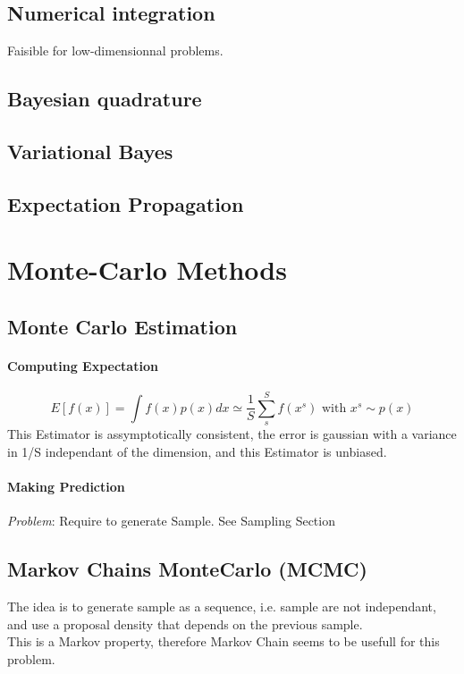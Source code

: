 		\subsection{Numerical integration}
			Faisible for low-dimensionnal problems.
		\subsection{Bayesian quadrature}

		\subsection{Variational Bayes}

		\subsection{Expectation Propagation}

	\section{Monte-Carlo Methods}

		\subsection{Monte Carlo Estimation}

			\paragraph*{Computing Expectation}

				\[
					E[f(x)] = \int f(x) p(x) dx \simeq \frac{1}{S} \sum_s^S f(x^s) \text{ with } x^s \sim p(x)
				\]
				This Estimator is assymptotically consistent, the error is gaussian with a variance in 1/S independant of the dimension, and this Estimator is unbiased.				

			\paragraph*{Making Prediction}

			\emph{Problem}: Require to generate Sample. See Sampling Section

		\subsection{Markov Chains MonteCarlo (MCMC)}

			The idea is to generate sample as a sequence, i.e. sample are not independant, and use a proposal density that depends on the previous sample.\\
			This is a Markov property, therefore Markov Chain seems to be usefull for this problem. 

